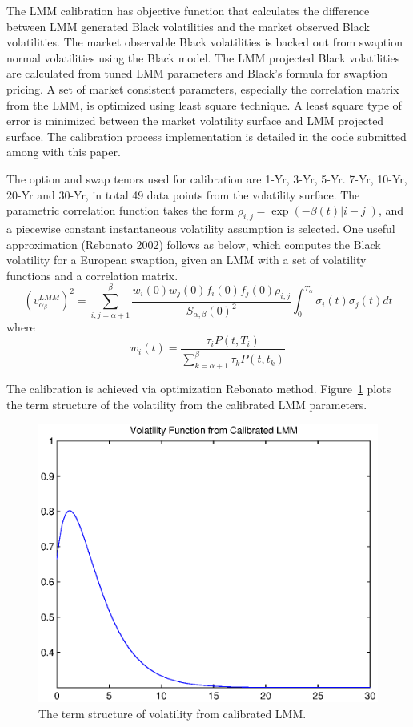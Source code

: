 The LMM calibration has objective function that calculates the difference between LMM generated Black volatilities and the market observed Black volatilities. The market observable Black volatilities is backed out from swaption normal volatilities using the Black model. The LMM projected Black volatilities are calculated from tuned LMM parameters and Black's formula for swaption pricing. A set of market consistent parameters, especially the correlation matrix from the LMM, is optimized using least square technique. A least square type of error is minimized between the market volatility surface and LMM projected surface. The calibration process implementation is detailed in the code submitted among with this paper.

The option and swap tenors used for calibration are 1-Yr, 3-Yr, 5-Yr. 7-Yr, 10-Yr, 20-Yr and 30-Yr, in total 49 data points from the volatility surface. The parametric correlation function takes the form $\rho_{i,j}=\exp(-\beta(t)|i-j|)$, and a piecewise constant instantaneous volatility assumption is selected. One useful approximation (Rebonato 2002) follows as below, which computes the Black volatility for a European swaption, given an LMM with a set of volatility functions and a correlation matrix.
$$
(v_{\alpha_\beta}^{LMM})^2 = \sum_{i,j=\alpha+1}^{\beta} \frac{w_{i}(0)w_{j}(0)f_i(0)f_j(0)\rho_{i,j}}{S_{\alpha,\beta}(0)^2} \int_0^{T_{\alpha}} \sigma_i(t)\sigma_j(t) dt
$$
where
$$
w_i(t) = \frac{\tau_i P(t,T_i)}{\sum_{k=\alpha+1}^{\beta} \tau_k P(t,t_k)}
$$

The calibration is achieved via optimization Rebonato method. Figure~\ref{fig::vol_term} plots the term structure of the volatility from the calibrated LMM parameters.

\begin{center}
  \begin{figure}
      \includegraphics[scale=0.6]{vol_func.eps}
      \caption{The term structure of volatility from calibrated LMM.}\label{fig::vol_term}
  \end{figure}
\end{center}

